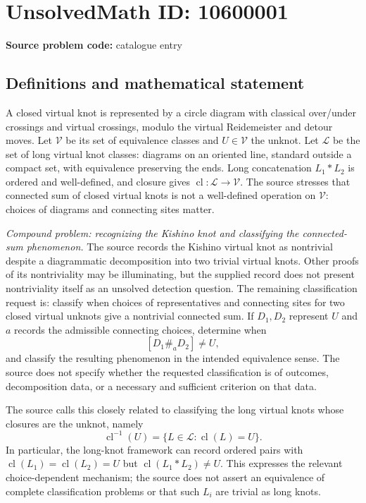 \documentclass[11pt]{article}
\begin{document}
\section*{UnsolvedMath ID: 10600001}
\textbf{Source problem code:} catalogue entry
\subsection{Definitions and mathematical statement}
A closed virtual knot is represented by a circle diagram with classical over/under crossings and virtual crossings, modulo the virtual Reidemeister and detour moves. Let \(\mathcal V\) be its set of equivalence classes and \(U\in\mathcal V\) the unknot. Let \(\mathcal L\) be the set of long virtual knot classes: diagrams on an oriented line, standard outside a compact set, with equivalence preserving the ends. Long concatenation \(L_1*L_2\) is ordered and well-defined, and closure gives \(\operatorname{cl}:\mathcal L\to\mathcal V\). The source stresses that connected sum of closed virtual knots is not a well-defined operation on \(\mathcal V\): choices of diagrams and connecting sites matter.

\emph{Compound problem: recognizing the Kishino knot and classifying the connected-sum phenomenon.} The source records the Kishino virtual knot as nontrivial despite a diagrammatic decomposition into two trivial virtual knots. Other proofs of its nontriviality may be illuminating, but the supplied record does not present nontriviality itself as an unsolved detection question. The remaining classification request is: classify when choices of representatives and connecting sites for two closed virtual unknots give a nontrivial connected sum. If \(D_1,D_2\) represent \(U\) and \(a\) records the admissible connecting choices, determine when
\[
 [D_1\mathbin{\#_a}D_2]\neq U,
\]
and classify the resulting phenomenon in the intended equivalence sense. The source does not specify whether the requested classification is of outcomes, decomposition data, or a necessary and sufficient criterion on that data.

The source calls this closely related to classifying the long virtual knots whose closures are the unknot, namely
\[
 \operatorname{cl}^{-1}(U)=\{L\in\mathcal L:\operatorname{cl}(L)=U\}.
\]
In particular, the long-knot framework can record ordered pairs with \(\operatorname{cl}(L_1)=\operatorname{cl}(L_2)=U\) but \(\operatorname{cl}(L_1*L_2)\neq U\). This expresses the relevant choice-dependent mechanism; the source does not assert an equivalence of complete classification problems or that such \(L_i\) are trivial as long knots.
\end{document}
